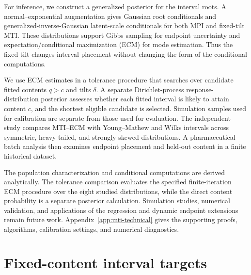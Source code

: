 For inference, we construct a generalized posterior for the interval roots.
A normal--exponential augmentation gives Gaussian root conditionals and
generalized-inverse-Gaussian latent-scale conditionals for both MPI and
fixed-tilt MTI. These distributions support Gibbs sampling for endpoint
uncertainty and expectation/conditional maximization (ECM) for mode estimation.
Thus the fixed tilt changes interval placement without changing the form of
the conditional computations.

We use ECM estimates in a tolerance procedure that searches over candidate
fitted contents \(q>c\) and tilts \(\delta\). A separate Dirichlet-process
response-distribution posterior assesses whether each fitted interval is
likely to attain content \(c\), and the shortest eligible candidate is
selected. Simulation samples used for calibration are separate from those
used for evaluation. The independent study compares MTI--ECM with
Young--Mathew and Wilks intervals across symmetric, heavy-tailed, and
strongly skewed distributions. A pharmaceutical batch analysis then examines
endpoint placement and held-out content in a finite historical dataset.

The population characterization and conditional computations are derived
analytically. The tolerance comparison evaluates the specified finite-iteration
ECM procedure over the eight studied distributions, while the direct content
probability is a separate posterior calculation. Simulation studies,
numerical validation, and applications of the regression and dynamic endpoint
extensions remain future work. Appendix~\ref{app:mti-technical} gives the
supporting proofs, algorithms, calibration settings, and numerical diagnostics.

\section{Fixed-content interval targets}
\label{rqr2026:sec:interval-functionals}

